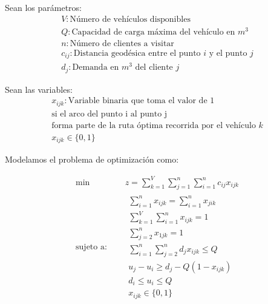 \documentclass[journal]{IEEEtran}                                                          %
\begin{document}
        Sean los parámetros:
        \begin{gather*}
            V: \text{Número de vehículos disponibles} \\
            Q: \text{Capacidad de carga máxima del vehículo en } m^3 \\
            n: \text{Número de clientes a visitar} \\
            c_{ij}: \text{Distancia geodésica entre el punto } i \text{ y el punto } j \\
            d_j: \text{Demanda en } m^3 \text{ del cliente } j 
        \end{gather*}
        
        Sean las variables:
        \begin{gather*}
            x_{ijk}: \text{Variable binaria que toma el valor de 1}\\
            \text{si el arco del punto i al punto j} \\
            \text{forma parte de la ruta óptima recorrida por el vehículo } k \\
            x_{ijk} \in \{0, 1\}
        \end{gather*}
        
        Modelamos el problema de optimización como:
        
        \begin{equation*}
        	\begin{aligned}
        		\text{min } \quad & z = \sum_{k=1}^{V} \sum_{j=1}^{n} \sum_{i=1}^{n} c_{ij} x_{ijk}\\
        		\text{sujeto a: }\quad &
        		\begin{array}{c}
        			\displaystyle\sum_{i=1}^{n} x_{ijk} = \sum_{i=1}^{n} x_{jik} \\[3pt]
                    \displaystyle\sum_{k=1}^{V} \sum_{i=1}^{n} x_{ijk} = 1 \\[3pt]
                    \displaystyle\sum_{j=2}^{n} x_{1jk} = 1 \\[3pt]
                    \displaystyle\sum_{i=1}^{n} \sum_{j=2}^{n} d_{j} x_{ijk} \leq Q \\[3pt]
                    u_{j} - u_{i} \geq d_j - Q (1 - x_{ijk}) \\[3pt]
                    d_i \leq u_i \leq Q \\[3pt]
                    x_{ijk} \in \{0, 1\}
        		\end{array}
        	\end{aligned}
        \end{equation*}
        
\end{document}
